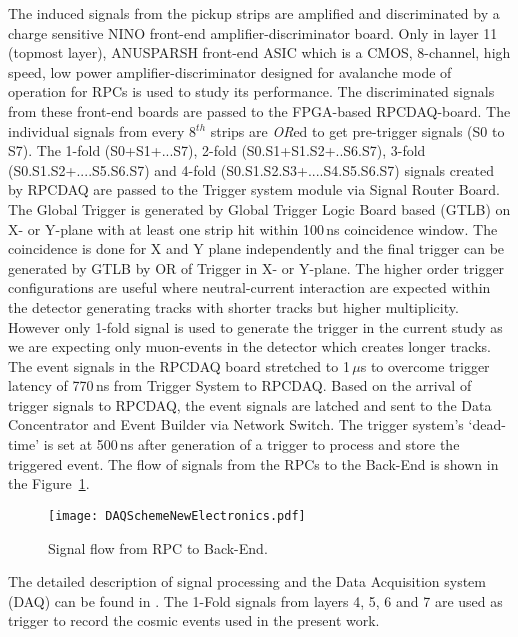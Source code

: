 The induced signals from the pickup strips are amplified and
discriminated by a charge sensitive NINO\cite{nino} front-end
amplifier-discriminator board. Only in layer 11 (topmost layer),
ANUSPARSH front-end ASIC\cite{anusp} which is a CMOS, 8-channel,
high speed, low power amplifier-discriminator designed for
avalanche mode of operation for RPCs is used to study its performance.
The discriminated signals from these front-end boards are passed
to the FPGA-based RPCDAQ-board. The individual signals from every 
8$^{th}$ strips are \emph{OR}ed to get pre-trigger signals (S0 to S7).
The 1-fold (S0+S1+...S7), 2-fold (S0.S1+S1.S2+..S6.S7),
3-fold (S0.S1.S2+....S5.S6.S7) and 4-fold
(S0.S1.S2.S3+....S4.S5.S6.S7) signals created by RPCDAQ are passed
to the Trigger system module via Signal Router Board. The Global
Trigger is generated by Global Trigger Logic Board based (GTLB)
on X- or Y-plane with at least one strip hit within
100\,ns coincidence window. The coincidence is done for X and Y plane
independently and the final trigger can be generated by GTLB by OR
of Trigger in X- or Y-plane. The higher order trigger configurations
are useful where neutral-current interaction are expected within the
detector generating tracks with shorter tracks but higher multiplicity.
However only 1-fold signal is used to generate the trigger in the
current study as we are expecting only muon-events in the detector
which creates longer tracks. The event signals in the RPCDAQ board
stretched to 1\,$\mu$s to overcome trigger latency of 770\,ns from
Trigger System to RPCDAQ. Based on the arrival of trigger signals to
RPCDAQ, the event signals are latched and sent to the Data Concentrator
and Event Builder via Network Switch. The trigger system's `dead-time'
is set at 500\,ns after generation of a trigger to process and store
the triggered event.
The flow of signals from the RPCs to the Back-End is shown in the
Figure~\ref{fig:sigflow}.
\begin{figure}[h]
  \texttt{[image: DAQSchemeNewElectronics.pdf]} 
  \caption{Signal flow from RPC to Back-End.}
  \label{fig:sigflow}
\end{figure}
The detailed description of signal processing and the Data Acquisition
system (DAQ) can be found in \cite{elec1}. The 1-Fold signals
from layers 4, 5, 6 and 7 are used as trigger to record the cosmic
events used in the present work.

